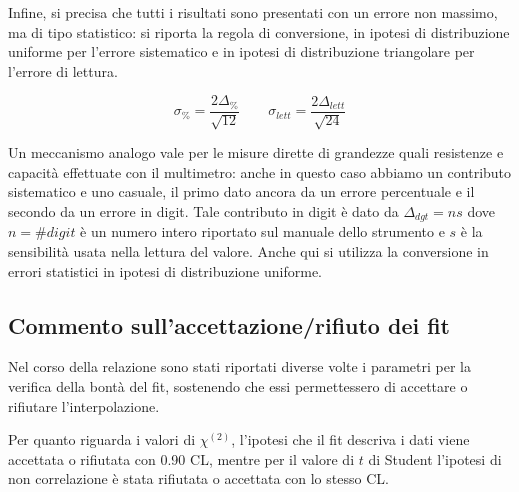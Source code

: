 \documentclass{article}
\begin{document}
Infine, si precisa che tutti i risultati sono presentati con un errore non massimo, ma di tipo statistico: si riporta la regola di conversione, in ipotesi di distribuzione uniforme per l'errore sistematico e in ipotesi di distribuzione triangolare per l'errore di lettura.

\begin{equation}
\sigma_{\%}=\frac{2\Delta_{\%}}{\sqrt{12}} \quad \quad \sigma_{lett}=\frac{2\Delta_{lett}}{\sqrt{24}}
\end{equation}

Un meccanismo analogo vale per le misure dirette di grandezze quali resistenze e capacità effettuate con il multimetro: anche in questo caso abbiamo un contributo sistematico e uno casuale, il primo dato ancora da un errore percentuale e il secondo da un errore in digit. Tale contributo in digit è dato da $\Delta_{dgt}=ns$ dove $n=\#digit$ è un numero intero riportato sul manuale dello strumento e $s$ è la sensibilità usata nella lettura del valore. Anche qui si utilizza la conversione in errori statistici in ipotesi di distribuzione uniforme.

\subsection{Commento sull'accettazione/rifiuto dei fit}
Nel corso della relazione sono stati riportati diverse volte i parametri per la verifica della bontà del fit, sostenendo che essi permettessero di accettare o rifiutare l'interpolazione.


Per quanto riguarda i valori di $\chi^{(2)}$, l'ipotesi che il fit descriva i dati viene accettata o rifiutata con 0.90 CL, mentre
per il valore di $t$ di Student l'ipotesi di non correlazione è stata rifiutata o accettata con lo stesso CL.
\end{document}
